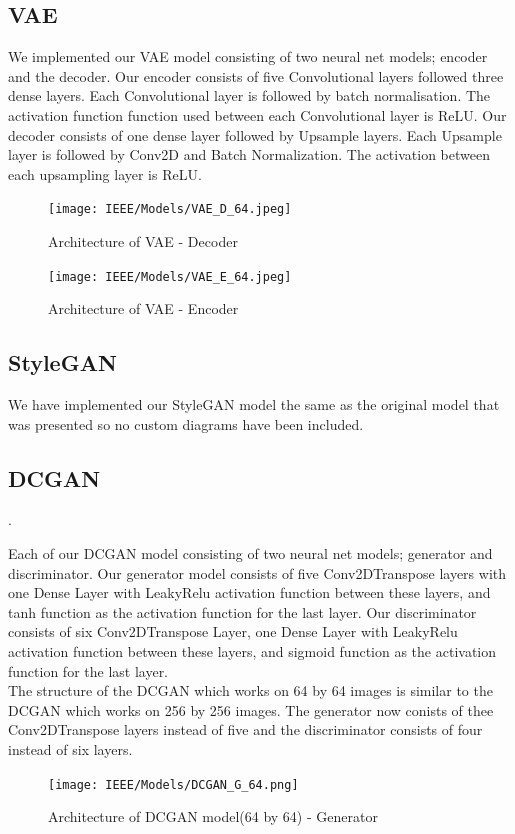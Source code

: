 \documentclass[conference]{IEEEtran}
\begin{document}
\subsection{VAE}
We implemented our VAE model consisting of two neural net models; encoder and the decoder. Our encoder consists of five Convolutional layers followed three dense layers. Each Convolutional layer is followed by batch normalisation. The activation function function used between each Convolutional layer is ReLU. Our decoder consists of one dense layer followed by Upsample layers. Each Upsample layer is followed by Conv2D and Batch Normalization. The activation between each upsampling layer is ReLU.


\begin{figure}[htbp]
\centerline{\texttt{[image: IEEE/Models/VAE\_D\_64.jpeg]}}
\caption{Architecture of VAE - Decoder}
\label{fig}
\end{figure}
\break
\begin{figure}[htbp]
\centerline{\texttt{[image: IEEE/Models/VAE\_E\_64.jpeg]}}
\caption{Architecture of VAE - Encoder}
\label{fig}
\end{figure}
\subsection{StyleGAN}
We have implemented our StyleGAN model the same as the original model that was presented so no custom diagrams have been included.
\subsection{DCGAN}.

Each of our DCGAN model consisting of two neural net models; generator and  discriminator. Our generator model consists of five Conv2DTranspose layers with one Dense Layer with LeakyRelu activation function between these layers, and tanh function as the activation function for the last layer. Our discriminator consists of six Conv2DTranspose Layer, one Dense Layer with LeakyRelu activation function between these layers, and sigmoid function as the activation function for the last layer. \\ The structure of the DCGAN which works on 64 by 64 images is similar to the DCGAN which works on 256 by 256 images. The generator now conists of thee Conv2DTranspose layers instead of five and the discriminator consists of four instead of six layers.

\begin{figure}[h!]
\centerline{\texttt{[image: IEEE/Models/DCGAN\_G\_64.png]}}
\caption{Architecture of DCGAN model(64 by 64) - Generator}
\label{fig}
\end{figure}
\end{document}
